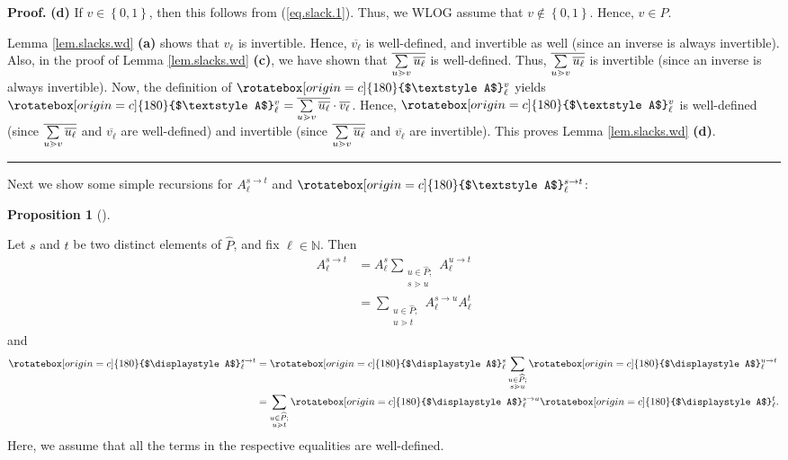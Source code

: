 \documentclass[numbers=enddot,12pt,final,onecolumn,notitlepage]{scrartcl}%
\theoremstyle{definition}
\newtheorem{prop}[theo]{Proposition}
\newenvironment{proposition}[1][]
{\begin{prop}[#1]\begin{leftbar}}
{\end{leftbar}\end{prop}}
\newenvironment{verlong}{}{}
\newcommand{\upslack}{\mathchoice{\rotatebox[origin=c]{180}{$\displaystyle A$}}{\rotatebox[origin=c]{180}{$\textstyle A$}}{\rotatebox[origin=c]{180}{$\scriptstyle A$}}{\rotatebox[origin=c]{180}{$\scriptscriptstyle A$}}}
\newcommand{\downslack}{A}
\newenvironment{proof}[1][Proof]{\noindent\textbf{#1.} }{\ \rule{0.5em}{0.5em}}
\let\sumnonlimits\sum
\renewcommand{\sum}{\sumnonlimits\limits}
\begin{document}
\begin{verlong}
\begin{proof}
\textbf{(d)} If $v\in\left\{  0,1\right\}  $, then this follows from
(\ref{eq.slack.1}). Thus, we WLOG assume that $v\notin\left\{  0,1\right\}  $.
Hence, $v\in P$.

Lemma \ref{lem.slacks.wd} \textbf{(a)} shows that $v_{\ell}$ is invertible.
Hence, $\overline{v_{\ell}}$ is well-defined, and invertible as well (since an
inverse is always invertible). Also, in the proof of Lemma \ref{lem.slacks.wd}
\textbf{(c)}, we have shown that $\overline{\sum\limits_{u\gtrdot v}%
\overline{u_{\ell}}}$ is well-defined. Thus, $\overline{\sum\limits_{u\gtrdot
v}\overline{u_{\ell}}}$ is invertible (since an inverse is always invertible).
Now, the definition of $\upslack_{\ell}^{v}$ yields $\upslack_{\ell}%
^{v}=\overline{\sum\limits_{u\gtrdot v}\overline{u_{\ell}}}\cdot
\overline{v_{\ell}}$. Hence, $\upslack_{\ell}^{v}$ is well-defined (since
$\overline{\sum\limits_{u\gtrdot v}\overline{u_{\ell}}}$ and $\overline
{v_{\ell}}$ are well-defined) and invertible (since $\overline{\sum
\limits_{u\gtrdot v}\overline{u_{\ell}}}$ and $\overline{v_{\ell}}$ are
invertible). This proves Lemma \ref{lem.slacks.wd} \textbf{(d)}.
\end{proof}
\end{verlong}

Next we show some simple recursions for $\downslack_{\ell}^{s\rightarrow t}$
and $\upslack_{\ell}^{s\rightarrow t}$:

\begin{proposition}
\label{prop.slacks.rec}Let $s$ and $t$ be two distinct elements of
$\widehat{P}$, and fix $\ell\in\mathbb{N}$. Then
\begin{align}
\downslack_{\ell}^{s\rightarrow t}  &  =\downslack_{\ell}^{s}\sum
_{\substack{u\in\widehat{P};\\s\gtrdot u}}\downslack_{\ell}^{u\rightarrow
t}\label{eq.prop.slacks.rec.down1}\\
&  =\sum_{\substack{u\in\widehat{P};\\u\gtrdot t}}\downslack_{\ell
}^{s\rightarrow u}\downslack_{\ell}^{t} \label{eq.prop.slacks.rec.down2}%
\end{align}
and
\begin{align}
\upslack_{\ell}^{s\rightarrow t}  &  =\upslack_{\ell}^{s}\sum_{\substack{u\in
\widehat{P};\\s\gtrdot u}}\upslack_{\ell}^{u\rightarrow t}%
\label{eq.prop.slacks.rec.up1}\\
&  =\sum_{\substack{u\in\widehat{P};\\u\gtrdot t}}\upslack_{\ell
}^{s\rightarrow u}\upslack_{\ell}^{t}. \label{eq.prop.slacks.rec.up2}%
\end{align}
Here, we assume that all the terms in the respective equalities are well-defined.
\end{proposition}
\end{document}
